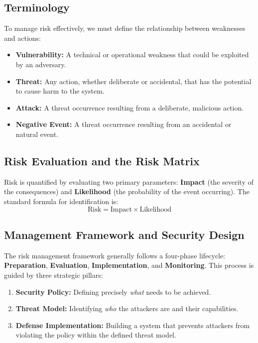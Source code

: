 \subsection{Terminology}
To manage risk effectively, we must define the relationship between weaknesses and actions:
\begin{itemize}
    \item \textbf{Vulnerability:} A technical or operational weakness that could be exploited by an adversary.
    \item \textbf{Threat:} Any action, whether deliberate or accidental, that has the potential to cause harm to the system.
    \item \textbf{Attack:} A threat occurrence resulting from a deliberate, malicious action.
    \item \textbf{Negative Event:} A threat occurrence resulting from an accidental or natural event.
\end{itemize}

\subsection{Risk Evaluation and the Risk Matrix}
Risk is quantified by evaluating two primary parameters: \textbf{Impact} (the severity of the consequences) and \textbf{Likelihood} (the probability of the event occurring).
The standard formula for identification is:
\[ \text{Risk} = \text{Impact} \times \text{Likelihood} \]


\subsection{Management Framework and Security Design}
The risk management framework generally follows a four-phase lifecycle: \textbf{Preparation}, \textbf{Evaluation}, \textbf{Implementation}, and \textbf{Monitoring}. This process is guided by three strategic pillars:
\begin{enumerate}
    \item \textbf{Security Policy:} Defining precisely \textit{what} needs to be achieved.
    \item \textbf{Threat Model:} Identifying \textit{who} the attackers are and their capabilities.
    \item \textbf{Defense Implementation:} Building a system that prevents attackers from violating the policy within the defined threat model.
\end{enumerate}

